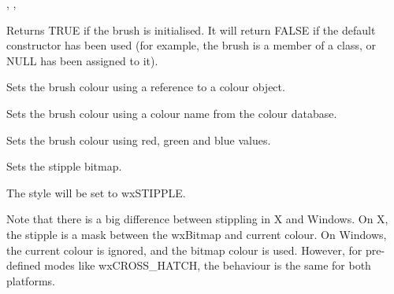 
, ,\rtfsp
{}

\label{wxbrushok}


Returns TRUE if the brush is initialised. It will return FALSE if the default
constructor has been used (for example, the brush is a member of a class, or
NULL has been assigned to it).

\label{wxbrushsetcolour}


Sets the brush colour using a reference to a colour object.


Sets the brush colour using a colour name from the colour database.


Sets the brush colour using red, green and blue values.



\label{wxbrushsetstipple}


Sets the stipple bitmap.




The style will be set to wxSTIPPLE.

Note that there is a big difference between stippling in X and Windows.
On X, the stipple is a mask between the wxBitmap and current colour.
On Windows, the current colour is ignored, and the bitmap colour is used.
However, for pre-defined modes like wxCROSS\_HATCH, the behaviour is the
same for both platforms.



